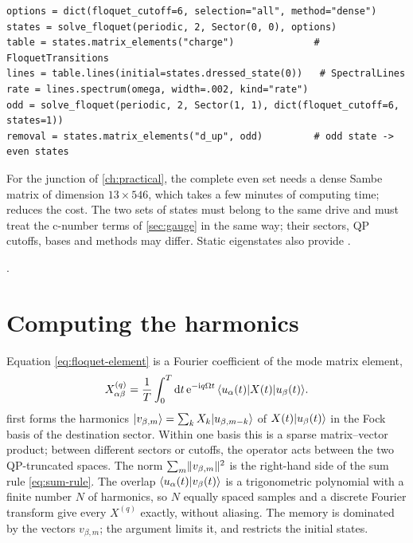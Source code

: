 \begin{incode}
\begin{lstlisting}[frame=none,backgroundcolor={},aboveskip=0pt,belowskip=0pt]
options = dict(floquet_cutoff=6, selection="all", method="dense")
states = solve_floquet(periodic, 2, Sector(0, 0), options)
table = states.matrix_elements("charge")              # FloquetTransitions
lines = table.lines(initial=states.dressed_state(0))   # SpectralLines
rate = lines.spectrum(omega, width=.002, kind="rate")
odd = solve_floquet(periodic, 2, Sector(1, 1), dict(floquet_cutoff=6, states=1))
removal = states.matrix_elements("d_up", odd)         # odd state -> even states
\end{lstlisting}
For the junction of \cref{ch:practical}, the complete even set needs a dense Sambe
matrix of dimension $13\times546$, which takes a few minutes of computing time;
 reduces the cost. The two sets of states must belong to the same drive
and must treat the c-number terms of \cref{sec:gauge} in the same way; their sectors, QP
cutoffs, bases and methods may differ. Static eigenstates also provide
.
\par\smallskip{}.
\end{incode}

\section{Computing the harmonics}

Equation \eqref{eq:floquet-element} is a Fourier coefficient of the mode matrix element,
\begin{equation}
  X^{(q)}_{\alpha\beta}=\frac1T\int_0^T\mathrm{d} t\,\mathrm{e}^{-\mathrm{i} q\Omega t}\,
  \langle u_\alpha(t)\vert X(t)\vert u_\beta(t)\rangle .
\end{equation}
\pkg{} first forms the harmonics $\lvert v_{\beta,m}\rangle=\sum_kX_k\lvert u_{\beta,m-k}\rangle$ of
$X(t)\lvert u_\beta(t)\rangle$ in the Fock basis of the destination sector. Within one basis this is
a sparse matrix--vector product; between different sectors or cutoffs, the operator acts
between the two QP-truncated spaces. The norm $\sum_m\lVert v_{\beta,m}\rVert^2$ is the
right-hand side of the sum rule \eqref{eq:sum-rule}. The overlap
$\langle u_\alpha(t)\vert v_\beta(t)\rangle$ is a trigonometric polynomial with a finite number $N$ of
harmonics, so $N$ equally spaced samples and a discrete Fourier transform give every
$X^{(q)}$ exactly, without aliasing. The memory is dominated by the vectors $v_{\beta,m}$;
the argument  limits it, and  restricts the initial
states.

